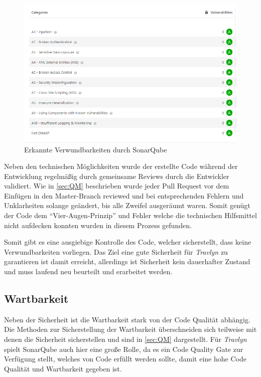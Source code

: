 	\begin{figure}[ht!]
		\centering
		\includegraphics[width=1\textwidth]{images/Verwundbarkeiten_SonarQube.png}
		\caption{Erkannte Verwundbarkeiten durch SonarQube}
		\label{fig:sonarqube_result}
	\end{figure}

	Neben den technischen Möglichkeiten wurde der erstellte Code während der Entwicklung regelmäßig durch gemeinsame Reviews durch die Entwickler validiert. Wie in \autoref{sec:QM} beschrieben wurde jeder Pull Request vor dem Einfügen in den Master-Branch reviewed und bei entsprechenden Fehlern und Unklarheiten solange geändert, bis alle Zweifel ausgeräumt waren. Somit genügt der Code dem \enquote{Vier-Augen-Prinzip} und Fehler welche die technischen Hilfsmittel nicht aufdecken konnten wurden in diesem Prozess gefunden.
	
	\vspace{0.25cm}
	
	Somit gibt es eine ausgiebige Kontrolle des Code, welcher sicherstellt, dass keine Verwundbarkeiten vorliegen. Das Ziel eine gute Sicherheit für \textit{Travlyn} zu garantieren ist damit erreicht, allerdings ist Sicherheit kein dauerhafter Zustand und muss laufend neu beurteilt und erarbeitet werden.
	
	\subsection{Wartbarkeit}
	Neben der Sicherheit ist die Wartbarkeit stark von der Code Qualität abhängig. Die Methoden zur Sicherstellung der Wartbarkeit überschneiden sich teilweise mit denen die Sicherheit sicherstellen und sind in \autoref{sec:QM} dargestellt. Für \textit{Travlyn} spielt SonarQube auch hier eine große Rolle, da es ein Code Quality Gate zur Verfügung stellt, welches von Code erfüllt werden sollte, damit eine hohe Code Qualität und Wartbarkeit gegeben ist.
	
